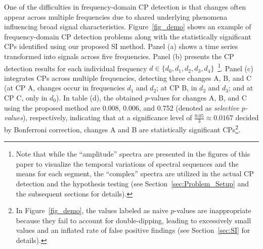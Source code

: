 One of the difficulties in frequency-domain CP detection is that changes often appear across multiple frequencies due to shared underlying phenomena influencing broad signal characteristics.
%
Figure~\ref{fig_demo} shows an example of frequency-domain CP detection problems along with the statistically significant CPs identified using our proposed SI method. 
%
Panel (a) shows a time series transformed into signals across five frequencies.
% 
Panel (b) presents the CP detection results for each individual frequency $d \in \{d_0, d_1, d_2, d_3, d_4\}$~\footnote{
  Note that while the ``amplitude'' spectra are presented in the figures of this paper to visualize the temporal variations of spectral sequences and the means for each segment, 
  the ``complex'' spectra are utilized in the actual CP detection and the hypothesis testing
  (see Section~\ref{sec:Problem_Setup} and the subsequent sections for details).
}.
%
Panel (c) integrates CPs across multiple frequencies, detecting three changes A, B, and C (at CP A, changes occur in frequencies $d_1$ and $d_2$; at CP B, in $d_2$ and $d_3$; and at CP C, only in $d_0$).
%
In table (d), the obtained $p$-values for changes A, B, and C using the proposed method are 0.008, 0.006, and 0.752 (denoted as \emph{selective $p$-values}), respectively, indicating that at a significance level of $\frac{0.05}{3} \approx 0.0167$ decided by Bonferroni correction, changes A and B are statistically significant CPs\footnote{
%
In Figure~\ref{fig_demo}, the values labeled as naive $p$-values are inappropriate because they fail to account for double-dipping, leading to excessively small values and an inflated rate of false positive findings (see Section~\ref{sec:SI} for details). %
%
}.

